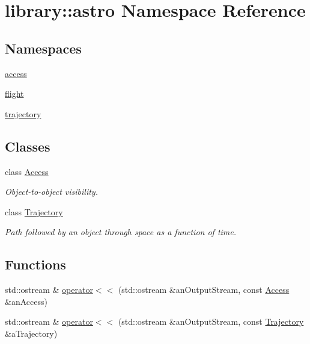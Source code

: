 \hypertarget{namespacelibrary_1_1astro}{}\section{library\+:\+:astro Namespace Reference}
\label{namespacelibrary_1_1astro}
\subsection*{Namespaces}
\begin{DoxyCompactItemize}
\item 
 \hyperlink{namespacelibrary_1_1astro_1_1access}{access}
\item 
 \hyperlink{namespacelibrary_1_1astro_1_1flight}{flight}
\item 
 \hyperlink{namespacelibrary_1_1astro_1_1trajectory}{trajectory}
\end{DoxyCompactItemize}
\subsection*{Classes}
\begin{DoxyCompactItemize}
\item 
class \hyperlink{classlibrary_1_1astro_1_1_access}{Access}
\begin{DoxyCompactList}\small\item\em Object-\/to-\/object visibility. \end{DoxyCompactList}\item 
class \hyperlink{classlibrary_1_1astro_1_1_trajectory}{Trajectory}
\begin{DoxyCompactList}\small\item\em Path followed by an object through space as a function of time. \end{DoxyCompactList}\end{DoxyCompactItemize}
\subsection*{Functions}
\begin{DoxyCompactItemize}
\item 
std\+::ostream \& \hyperlink{namespacelibrary_1_1astro_ab4fd99fd3c7f57416718f2e851a85f89}{operator$<$$<$} (std\+::ostream \&an\+Output\+Stream, const \hyperlink{classlibrary_1_1astro_1_1_access}{Access} \&an\+Access)
\item 
std\+::ostream \& \hyperlink{namespacelibrary_1_1astro_ad08e7276c4e2a0a3e256b1d8a7a92d41}{operator$<$$<$} (std\+::ostream \&an\+Output\+Stream, const \hyperlink{classlibrary_1_1astro_1_1_trajectory}{Trajectory} \&a\+Trajectory)
\end{DoxyCompactItemize}


